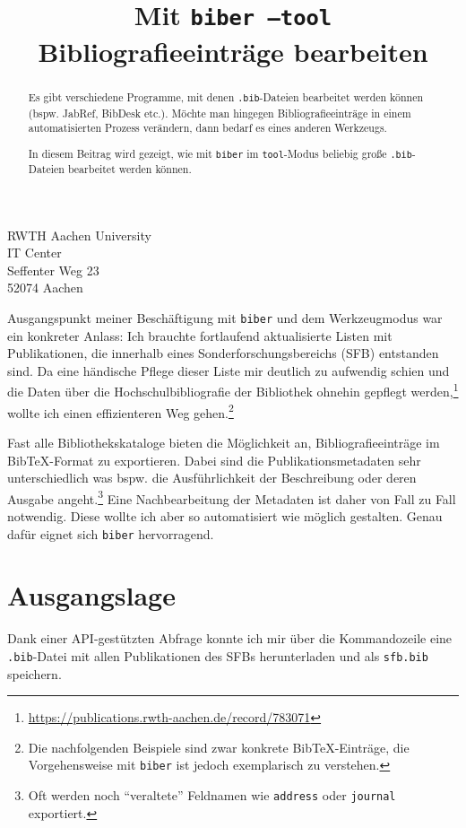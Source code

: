 \documentclass[ngerman]{dtk}
\begin{document}
\title{Mit \texttt{biber --tool} Bibliografieeinträge bearbeiten}
%
{RWTH Aachen University\\
IT Center\\
Seffenter Weg 23\\
52074 Aachen
}
\maketitle

\begin{abstract}
Es gibt verschiedene Programme, mit denen \texttt{.bib}-Dateien bearbeitet werden können (bspw. JabRef, BibDesk etc.).
Möchte man hingegen Bibliografieeinträge in einem automatisierten Prozess verändern,
dann bedarf es eines anderen Werkzeugs.

In diesem Beitrag wird gezeigt, wie mit \texttt{biber} im \texttt{tool}-Modus beliebig große \texttt{.bib}-Dateien bearbeitet werden können.
\end{abstract}
Ausgangspunkt meiner Beschäftigung mit \texttt{biber} und dem Werkzeugmodus war ein konkreter Anlass: 
Ich brauchte fortlaufend aktualisierte Listen mit Publikationen, 
die innerhalb eines Sonderforschungsbereichs (SFB) entstanden sind.
Da eine händische Pflege dieser Liste mir deutlich zu aufwendig schien und die Daten über
die Hochschulbibliografie der Bibliothek ohnehin gepflegt werden,\footnote{\url{https://publications.rwth-aachen.de/record/783071}} wollte ich einen effizienteren Weg gehen.\footnote{Die nachfolgenden Beispiele sind zwar konkrete BibTeX-Einträge, 
die Vorgehensweise mit \texttt{biber} ist jedoch exemplarisch zu verstehen.}   

Fast alle Bibliothekskataloge bieten die Möglichkeit an, 
 Bibliografieeinträge im BibTeX-Format zu exportieren.
Dabei sind die Publikationsmetadaten sehr unterschiedlich
was bspw. die Ausführlichkeit der Beschreibung oder deren Ausgabe angeht.\footnote{Oft werden noch ``veraltete'' Feldnamen wie \texttt{address} oder \texttt{journal} exportiert.}
Eine Nachbearbeitung der Metadaten ist daher von Fall zu Fall notwendig. 
Diese wollte ich aber so automatisiert wie möglich gestalten.
Genau dafür eignet sich \texttt{biber} hervorragend.

\section{Ausgangslage}
Dank einer API-gestützten Abfrage konnte ich mir über die Kommandozeile  
eine \texttt{.bib}-Datei mit allen Publikationen des SFBs herunterladen und als \texttt{sfb.bib} speichern.
\end{document}
